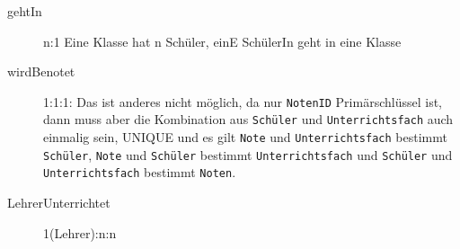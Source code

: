 \documentclass{bschlangaul-aufgabe}
\begin{document}
\begin{bAntwort}
\begin{center}
\end{center}


\begin{description}
\item[gehtIn] n:1 Eine Klasse hat n Schüler, einE SchülerIn geht in eine
Klasse

\item[wirdBenotet]  1:1:1: Das ist anderes nicht möglich, da nur
\texttt{NotenID} Primärschlüssel ist, dann muss aber die Kombination aus
\texttt{Schüler} und \texttt{Unter\-richtsfach} auch einmalig sein, \dh
UNIQUE und es gilt \texttt{Note} und \texttt{Unter\-richtsfach} bestimmt
\texttt{Schüler}, \texttt{Note} und \texttt{Schüler} bestimmt
\texttt{Unterrichtsfach} und \texttt{Schüler} und
\texttt{Unterrichtsfach} bestimmt
\texttt{Noten}.

\item[LehrerUnterrichtet] 1(Lehrer):n:n
\end{description}
\end{bAntwort}
\end{document}

